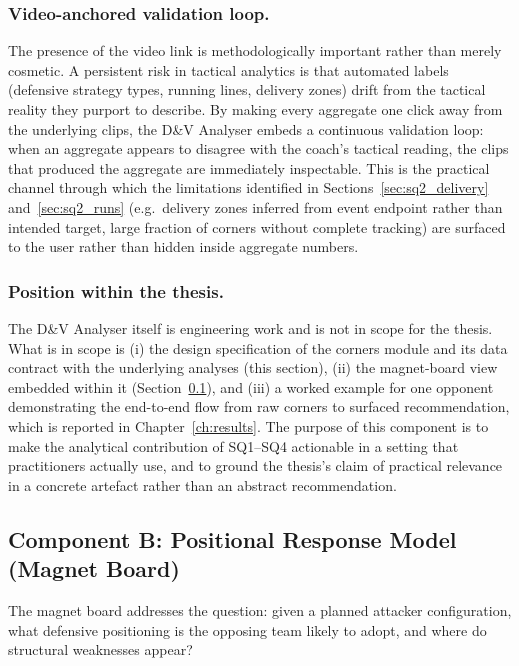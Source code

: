 \subsubsection{Video-anchored validation loop.}
The presence of the video link is methodologically important rather than
merely cosmetic. A persistent risk in tactical analytics is that
automated labels (defensive strategy types, running lines, delivery
zones) drift from the tactical reality they purport to describe. By
making every aggregate one click away from the underlying clips, the D\&V
Analyser embeds a continuous validation loop: when an aggregate appears
to disagree with the coach's tactical reading, the clips that produced
the aggregate are immediately inspectable. This is the practical channel
through which the limitations identified in Sections~\ref{sec:sq2_delivery}
and~\ref{sec:sq2_runs} (e.g.\ delivery zones inferred from event endpoint
rather than intended target, large fraction of corners without complete
tracking) are surfaced to the user rather than hidden inside aggregate
numbers.

\subsubsection{Position within the thesis.}
The D\&V Analyser itself is engineering work and is not in scope for the
thesis. What is in scope is (i) the design specification of the corners
module and its data contract with the underlying analyses
(this section), (ii) the magnet-board view embedded within it
(Section~\ref{sec:sq5_magnet}), and (iii) a worked example for one
opponent demonstrating the end-to-end flow from raw corners to surfaced
recommendation, which is reported in Chapter~\ref{ch:results}. The
purpose of this component is to make the analytical contribution of
SQ1–SQ4 actionable in a setting that practitioners actually use, and to
ground the thesis's claim of practical relevance in a concrete artefact
rather than an abstract recommendation.

\subsection{Component B: Positional Response Model (Magnet Board)}
\label{sec:sq5_magnet}

The magnet board addresses the question: given a planned attacker configuration,
what defensive positioning is the opposing team likely to adopt, and where do
structural weaknesses appear?

